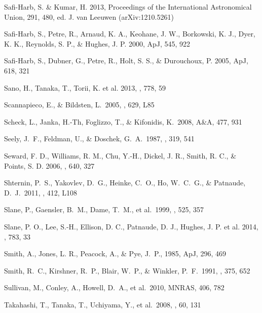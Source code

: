 \documentclass[11pt,a4paper]{article}
\begin{document}
{\begin{multicols}{2}
{\begin{thebibliography}{99}
 Safi-Harb, S. \&
  Kumar, H. 2013, Proceedings of the International Astronomical Union, 
  291, 480, ed. J. van Leeuwen  (arXiv:1210.5261)

        
 Safi-Harb, S., Petre, R.,
  Arnaud, K. A., Keohane, J. W., Borkowski, K. J., Dyer, K. K.,
  Reynolds, S. P., \& Hughes, J. P. 2000, ApJ, 545, 922
  
 Safi-Harb, S., Dubner, G.,
  Petre, R., Holt, S. S., \& Durouchoux, P. 2005, ApJ, 618, 321


Sano, H., Tanaka, T., Torii, K. et al. 2013, \apj, 778, 59


 Scannapieco,
  E., \& Bildsten, L.\ 2005, \apj, 629, L85

 Scheck, L., Janka, H.-Th,
  Foglizzo, T., \& Kifonidis, K.~2008, A\&A, 477, 931


 Seely, J.~F., Feldman,
U., \& Doschek, G.~A.\ 1987, \apj, 319, 541

Seward, F. D., Williams, R. M., Chu, Y.-H., Dickel, J. R., Smith, R. C., \& Points, S. D.
2006, \apj, 640, 327

 Shternin, P.~S., Yakovlev,
  D.~G., Heinke, C.~O., Ho, W.~C.~G., \& Patnaude, D.~J.\ 2011,
  \mnras, 412, L108

 Slane, P., Gaensler, 
B.~M., Dame, T.~M., et al.\ 1999, \apj, 525, 357 

Slane, P. O.,  Lee, S.-H., Ellison, D. C.,
 Patnaude, D. J., Hughes, J. P. et al. 2014, \apj, 783, 33


 Smith, A., Jones, L. R.,
  Peacock, A., \& Pye, J.~P., 1985, ApJ, 296, 469

 Smith, R.~C., Kirshner, 
R.~P., Blair, W.~P., \& Winkler, P.~F.\ 1991, \apj, 375, 652 

 Sullivan, M., Conley,
A., Howell, D.~A., et al.\ 2010, MNRAS, 406, 782

 Takahashi, T., 
Tanaka, T., Uchiyama, Y., et al.\ 2008, \pasj, 60, 131


\end{thebibliography}}
\end{multicols}}
\end{document}
